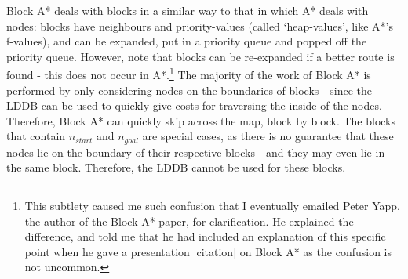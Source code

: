 \documentclass[12pt,twoside,notitlepage]{report}
\begin{document}
\noindent
Block A* deals with blocks in a similar way to that in which A* deals with nodes: blocks have neighbours and priority-values (called `heap-values', like A*'s f-values), and can be expanded, put in a priority queue and popped off the priority queue. However, note that blocks can be re-expanded if a better route is found - this does not occur in A*.\footnote{This subtlety caused me such confusion that I eventually emailed Peter Yapp, the author of the Block A* paper, for clarification. He explained the difference, and told me that he had included an explanation of this specific point when he gave a presentation [citation] on Block A* as the confusion is not uncommon.} The majority of the work of Block A* is performed by only considering nodes on the boundaries of blocks - since the LDDB can be used to quickly give costs for traversing the inside of the nodes. Therefore, Block A* can quickly skip across the map, block by block. The blocks that contain {$n_{start}$} and {$n_{goal}$} are special cases, as there is no guarantee that these nodes lie on the boundary of their respective blocks - and they may even lie in the same block. Therefore, the LDDB cannot be used for these blocks.\\
\end{document}
